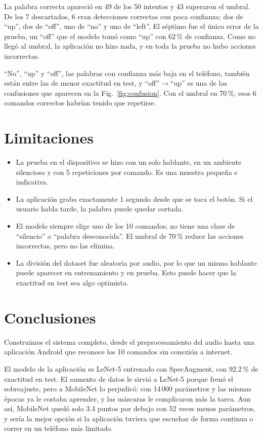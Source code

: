 \documentclass[conference]{IEEEtran}
\begin{document}
La palabra correcta apareció en 49 de los 50 intentos y 43 superaron el umbral. De los 7 descartados, 6 eran detecciones correctas con poca confianza: dos de ``up'', dos de ``off'', uno de ``no'' y uno de ``left''. El séptimo fue el único error de la prueba, un ``off'' que el modelo tomó como ``up'' con 62\,\% de confianza. Como no llegó al umbral, la aplicación no hizo nada, y en toda la prueba no hubo acciones incorrectas.

``No'', ``up'' y ``off'', las palabras con confianza más baja en el teléfono, también están entre las de menor exactitud en test, y ``off''$\rightarrow$``up'' es una de las confusiones que aparecen en la Fig.~\ref{fig:confusion}. Con el umbral en 70\,\%, esos 6 comandos correctos habrían tenido que repetirse.

\section{Limitaciones}
\begin{itemize}
  \item La prueba en el dispositivo se hizo con un solo hablante, en un ambiente silencioso y con 5 repeticiones por comando. Es una muestra pequeña e indicativa.
  \item La aplicación graba exactamente 1 segundo desde que se toca el botón. Si el usuario habla tarde, la palabra puede quedar cortada.
  \item El modelo siempre elige uno de los 10 comandos; no tiene una clase de ``silencio'' o ``palabra desconocida''. El umbral de 70\,\% reduce las acciones incorrectas, pero no las elimina.
  \item La división del dataset fue aleatoria por audio, por lo que un mismo hablante puede aparecer en entrenamiento y en prueba. Esto puede hacer que la exactitud en test sea algo optimista.
\end{itemize}

\section{Conclusiones}
Construimos el sistema completo, desde el preprocesamiento del audio hasta una aplicación Android que reconoce los 10 comandos sin conexión a internet.

El modelo de la aplicación es LeNet-5 entrenado con SpecAugment, con 92.2\,\% de exactitud en test. El aumento de datos le sirvió a LeNet-5 porque frenó el sobreajuste, pero a MobileNet lo perjudicó: con 14\,000 parámetros y las mismas épocas ya le costaba aprender, y las máscaras le complicaron más la tarea. Aun así, MobileNet quedó solo 3.4 puntos por debajo con 52 veces menos parámetros, y sería la mejor opción si la aplicación tuviera que escuchar de forma continua o correr en un teléfono más limitado.
\end{document}
